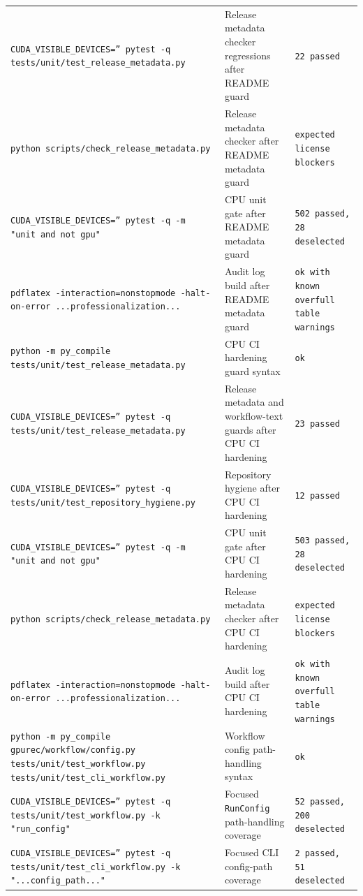 \documentclass[11pt]{article}
\begin{document}
\begin{center}
\begin{tabular}{lll}
\texttt{CUDA\_VISIBLE\_DEVICES='' pytest -q tests/unit/test\_release\_metadata.py} &
Release metadata checker regressions after README guard &
\texttt{22 passed} \\
\texttt{python scripts/check\_release\_metadata.py} &
Release metadata checker after README metadata guard &
\texttt{expected license blockers} \\
\texttt{CUDA\_VISIBLE\_DEVICES='' pytest -q -m "unit and not gpu"} &
CPU unit gate after README metadata guard &
\texttt{502 passed, 28 deselected} \\
\texttt{pdflatex -interaction=nonstopmode -halt-on-error ...professionalization...} &
Audit log build after README metadata guard &
\texttt{ok with known overfull table warnings} \\
\texttt{python -m py\_compile tests/unit/test\_release\_metadata.py} &
CPU CI hardening guard syntax &
\texttt{ok} \\
\texttt{CUDA\_VISIBLE\_DEVICES='' pytest -q tests/unit/test\_release\_metadata.py} &
Release metadata and workflow-text guards after CPU CI hardening &
\texttt{23 passed} \\
\texttt{CUDA\_VISIBLE\_DEVICES='' pytest -q tests/unit/test\_repository\_hygiene.py} &
Repository hygiene after CPU CI hardening &
\texttt{12 passed} \\
\texttt{CUDA\_VISIBLE\_DEVICES='' pytest -q -m "unit and not gpu"} &
CPU unit gate after CPU CI hardening &
\texttt{503 passed, 28 deselected} \\
\texttt{python scripts/check\_release\_metadata.py} &
Release metadata checker after CPU CI hardening &
\texttt{expected license blockers} \\
\texttt{pdflatex -interaction=nonstopmode -halt-on-error ...professionalization...} &
Audit log build after CPU CI hardening &
\texttt{ok with known overfull table warnings} \\
\texttt{python -m py\_compile gpurec/workflow/config.py tests/unit/test\_workflow.py tests/unit/test\_cli\_workflow.py} &
Workflow config path-handling syntax &
\texttt{ok} \\
\texttt{CUDA\_VISIBLE\_DEVICES='' pytest -q tests/unit/test\_workflow.py -k "run\_config"} &
Focused \texttt{RunConfig} path-handling coverage &
\texttt{52 passed, 200 deselected} \\
\texttt{CUDA\_VISIBLE\_DEVICES='' pytest -q tests/unit/test\_cli\_workflow.py -k "...config\_path..."} &
Focused CLI config-path coverage &
\texttt{2 passed, 51 deselected} \\

\end{tabular}
\end{center}
\end{document}
